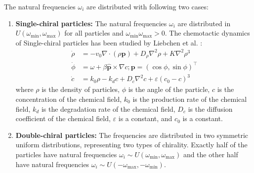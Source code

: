 \documentclass{article}
\begin{document}
The natural frequencies $\omega_i$ are distributed with following two cases:
\begin{enumerate}
    \item \textbf{Single-chiral particles:} The natural frequencies $\omega_i$ are distributed in $U\left( \omega _{\min},\omega _{\max} \right)$ for all particles and $\omega _{\min}\omega _{\max}>0$.
    The chemotactic dynamics of Single-chiral particles has been studied by Liebchen et al. \cite{C6SM01162D}:
    \begin{subequations}
        \begin{align}
            \dot{\rho}&=-v_0\nabla \cdot \left( \rho \mathbf{p} \right) +D_{\rho}\nabla ^2\rho +K\nabla ^2\rho ^3\\
            \dot{\phi}&=\omega +\beta \mathbf{\hat{p}}\times \nabla c; \mathbf{p}=\left( \cos \phi ,\sin \phi \right) ^{\top}\\
            \dot{c}&=k_0\rho -k_dc+D_c\nabla ^2c+\varepsilon \left( c_0-c \right) ^3
        \end{align}
    \end{subequations}
        where $\rho$ is the density of particles, $\phi$ is the angle of the particle, $c$ is the concentration of the chemical field, $k_0$ is the production rate of the chemical field, $k_d$ is the degradation rate of the chemical field, $D_c$ is the diffusion coefficient of the chemical field, $\varepsilon$ is a constant, and $c_0$ is a constant.
    
    \item \textbf{Double-chiral particles:} The frequencies are distributed in two symmetric uniform distributions, representing two types of chirality. Exactly half of the particles have natural frequencies $\omega_i \sim U\left( \omega _{\min},\omega _{\max} \right)$ and the other half have natural frequencies $\omega_i \sim U\left( -\omega _{\max},-\omega _{\min} \right)$.
\end{enumerate}
\end{document}
